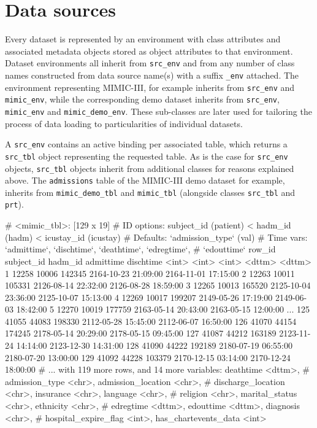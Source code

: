 \documentclass[
  notitle,
  nojss,
  noheadings]{jss}
\begin{document}
\hypertarget{data-sources}{%
\section{Data sources}\label{data-sources}}

Every dataset is represented by an environment with class attributes and
associated metadata objects stored as object attributes to that
environment. Dataset environments all inherit from \texttt{src\_env} and
from any number of class names constructed from data source name(s) with
a suffix \texttt{\_env} attached. The environment representing
MIMIC-III, for example inherits from \texttt{src\_env} and
\texttt{mimic\_env}, while the corresponding demo dataset inherits from
\texttt{src\_env}, \texttt{mimic\_env} and \texttt{mimic\_demo\_env}.
These sub-classes are later used for tailoring the process of data
loading to particularities of individual datasets.

A \texttt{src\_env} contains an active binding per associated table,
which returns a \texttt{src\_tbl} object representing the requested
table. As is the case for \texttt{src\_env} objects, \texttt{src\_tbl}
objects inherit from additional classes for reasons explained above. The
\texttt{admissions} table of the MIMIC-III demo dataset for example,
inherits from \texttt{mimic\_demo\_tbl} and \texttt{mimic\_tbl}
(alongside classes \texttt{src\_tbl} and \texttt{prt}).

\begin{CodeChunk}
\begin{CodeOutput}
# <mimic_tbl>: [129 x 19]
# ID options:  subject_id (patient) < hadm_id (hadm) < icustay_id (icustay)
# Defaults:    `admission_type` (val)
# Time vars:   `admittime`, `dischtime`, `deathtime`, `edregtime`,
#   `edouttime`
    row_id subject_id hadm_id admittime           dischtime
     <int>      <int>   <int> <dttm>              <dttm>
  1  12258      10006  142345 2164-10-23 21:09:00 2164-11-01 17:15:00
  2  12263      10011  105331 2126-08-14 22:32:00 2126-08-28 18:59:00
  3  12265      10013  165520 2125-10-04 23:36:00 2125-10-07 15:13:00
  4  12269      10017  199207 2149-05-26 17:19:00 2149-06-03 18:42:00
  5  12270      10019  177759 2163-05-14 20:43:00 2163-05-15 12:00:00
...
125  41055      44083  198330 2112-05-28 15:45:00 2112-06-07 16:50:00
126  41070      44154  174245 2178-05-14 20:29:00 2178-05-15 09:45:00
127  41087      44212  163189 2123-11-24 14:14:00 2123-12-30 14:31:00
128  41090      44222  192189 2180-07-19 06:55:00 2180-07-20 13:00:00
129  41092      44228  103379 2170-12-15 03:14:00 2170-12-24 18:00:00
# ... with 119 more rows, and 14 more variables: deathtime <dttm>,
#   admission_type <chr>, admission_location <chr>,
#   discharge_location <chr>, insurance <chr>, language <chr>,
#   religion <chr>, marital_status <chr>, ethnicity <chr>,
#   edregtime <dttm>, edouttime <dttm>, diagnosis <chr>,
#   hospital_expire_flag <int>, has_chartevents_data <int>
\end{CodeOutput}
\end{CodeChunk}
\end{document}
